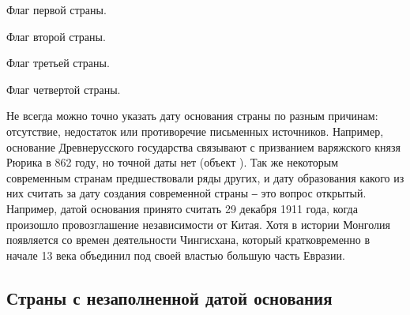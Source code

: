 \begin{marginfigure}[0.0cm]
	{
		\setlength{\fboxsep}{0pt}%
		\setlength{\fboxrule}{1pt}%
	}
	\caption{Флаг первой страны.}%
	\label{fig:flag_kor}%
\end{marginfigure}
\begin{marginfigure}[0.0cm]
	{
		\setlength{\fboxsep}{0pt}%
		\setlength{\fboxrule}{1pt}%
	}
	\caption{Флаг второй страны.}%
	\label{fig:flag_singapore}%
\end{marginfigure}
\begin{marginfigure}[0.0cm]
	{
		\setlength{\fboxsep}{0pt}%
		\setlength{\fboxrule}{1pt}%
	}
	\caption{Флаг третьей страны.}%
	\label{fig:flag_israel}%
\end{marginfigure}
\begin{marginfigure}[0.0cm]
	{
		\setlength{\fboxsep}{0pt}%
		\setlength{\fboxrule}{1pt}%
	}
	\caption{Флаг четвертой страны.}%
	\label{fig:flag_mongolia}%
\end{marginfigure}

Не всегда можно точно указать дату основания страны по разным причинам: отсутствие, недостаток или противоречие письменных источников. Например, основание Древнерусского государства связывают с призванием варяжского князя Рюрика в 862 году, но точной даты нет (объект ). Так же некоторым современным странам предшествовали ряды других, и дату образования какого из них считать за дату создания современной страны ‒ это вопрос открытый. Например, датой основания  принято считать 29 декабря 1911 года, когда произошло провозглашение независимости от Китая. Хотя в истории Монголия появляется со времен деятельности Чингисхана, который кратковременно в начале 13 века объединил под своей властью большую часть Евразии.



\subsection{Страны с незаполненной датой основания}

